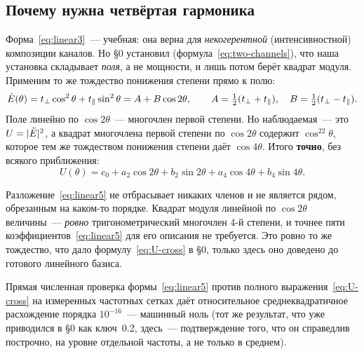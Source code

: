 \subsection{Почему нужна четвёртая гармоника}
\label{subsec:fourth-harmonic}

Форма~\eqref{eq:linear3}~--- учебная: она верна для \emph{некогерентной} (интенсивностной)
композиции каналов. Но §0 установил (формула~\eqref{eq:two-channels}), что наша установка
складывает \emph{поля}, а не мощности, и лишь потом берёт квадрат модуля. Применим то же
тождество понижения степени прямо к полю:
\begin{equation}
  \tilde{E}(\theta)=t_{\perp}\cos^2\theta+t_{\parallel}\sin^2\theta
  = A+B\cos2\theta,
  \qquad
  A=\tfrac12(t_{\perp}+t_{\parallel}),\quad B=\tfrac12(t_{\perp}-t_{\parallel}).
  \label{eq:field-linear}
\end{equation}
Поле линейно по $\cos2\theta$~--- многочлен первой степени. Но наблюдаемая~--- это
$U=|\tilde{E}|^2$, а квадрат многочлена первой степени по $\cos2\theta$ содержит $\cos^22\theta$,
которое тем же тождеством понижения степени даёт $\cos4\theta$. Итого \textbf{точно}, без всякого
приближения:
\begin{equation}
  U(\theta)=c_0+a_2\cos2\theta+b_2\sin2\theta+a_4\cos4\theta+b_4\sin4\theta .
  \label{eq:linear5}
\end{equation}

\begin{warning}
Разложение~\eqref{eq:linear5} не отбрасывает никаких членов и не является рядом, обрезанным на
каком-то порядке. Квадрат модуля линейной по $\cos2\theta$ величины~--- \emph{ровно}
тригонометрический многочлен 4-й степени, и точнее пяти коэффициентов~\eqref{eq:linear5} для его
описания не требуется. Это ровно то же тождество, что дало формулу~\eqref{eq:U-cross} в §0, только
здесь оно доведено до готового линейного базиса.
\end{warning}

\begin{example}
Прямая численная проверка формы~\eqref{eq:linear5} против полного выражения~\eqref{eq:U-cross} на
измеренных частотных сетках даёт относительное среднеквадратичное расхождение порядка
$10^{-16}$~--- машинный ноль (тот же результат, что уже приводился в §0 как ключ~0.2, здесь~---
подтверждение того, что он справедлив построчно, на уровне отдельной частоты, а не только в
среднем).
\end{example}

